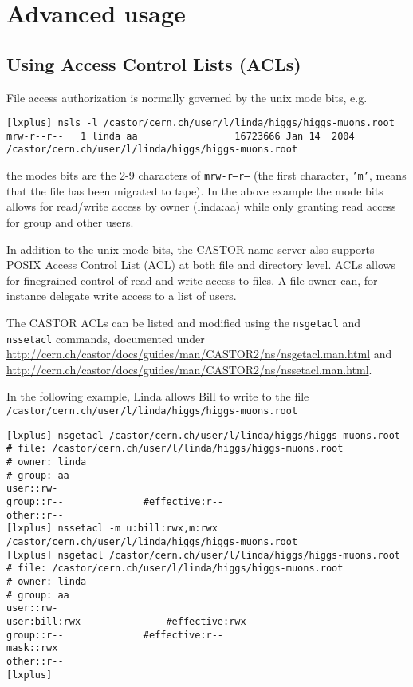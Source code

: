 \chapter{Advanced usage}
\section{Using Access Control Lists (ACLs)}
File access authorization is normally governed by the unix mode bits, e.g.
\begin{verbatim}
[lxplus] nsls -l /castor/cern.ch/user/l/linda/higgs/higgs-muons.root
mrw-r--r--   1 linda aa                 16723666 Jan 14  2004  /castor/cern.ch/user/l/linda/higgs/higgs-muons.root
\end{verbatim}
the modes bits are the 2-9 characters of {\tt mrw-r--r--} (the first character, {\tt 'm'}, means
that the file has been migrated to tape). In the above example the mode bits allows for read/write
access by owner (linda:aa) while only granting read access for group and other users.

In addition to the unix mode bits, the CASTOR name server also supports POSIX Access Control
List (ACL) at both file and directory level. ACLs allows for finegrained control of read and
write access to files. A file owner can, for instance delegate write access to a list of users.

The CASTOR ACLs can be listed and modified using the {\tt nsgetacl} and {\tt nssetacl} commands,
documented under \url{http://cern.ch/castor/docs/guides/man/CASTOR2/ns/nsgetacl.man.html} and
\url{http://cern.ch/castor/docs/guides/man/CASTOR2/ns/nssetacl.man.html}.

In the following example, Linda allows Bill to write to the file
{\tt /castor/cern.ch/user/l/linda/higgs/higgs-muons.root}

\begin{verbatim}
[lxplus] nsgetacl /castor/cern.ch/user/l/linda/higgs/higgs-muons.root
# file: /castor/cern.ch/user/l/linda/higgs/higgs-muons.root
# owner: linda
# group: aa
user::rw-
group::r--              #effective:r--
other::r--
[lxplus] nssetacl -m u:bill:rwx,m:rwx /castor/cern.ch/user/l/linda/higgs/higgs-muons.root
[lxplus] nsgetacl /castor/cern.ch/user/l/linda/higgs/higgs-muons.root
# file: /castor/cern.ch/user/l/linda/higgs/higgs-muons.root
# owner: linda
# group: aa
user::rw-
user:bill:rwx               #effective:rwx
group::r--              #effective:r--
mask::rwx
other::r--
[lxplus]
\end{verbatim}


